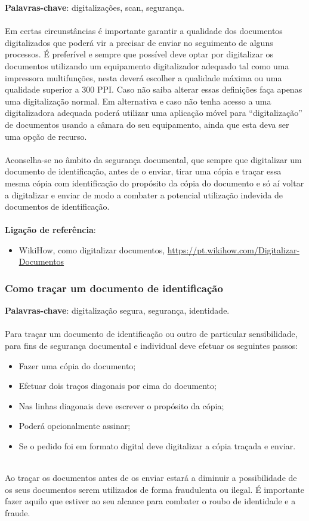\textbf{Palavras-chave}: digitalizações, scan, segurança. \\
\\
Em certas circunstâncias é importante garantir a qualidade dos
documentos digitalizados que poderá vir a precisar de enviar no
seguimento de alguns processos. É preferível e sempre que possível deve
optar por digitalizar os documentos utilizando um equipamento
digitalizador adequado tal como uma impressora multifunções, nesta
deverá escolher a qualidade máxima ou uma qualidade superior a 300 PPI.
Caso não saiba alterar essas definições faça apenas uma digitalização
normal. Em alternativa e caso não tenha acesso a uma digitalizadora
adequada poderá utilizar uma aplicação móvel para ``digitalização'' de
documentos usando a câmara do seu equipamento, ainda que esta deva ser
uma opção de recurso. \\
\\
Aconselha-se no âmbito da segurança documental, que sempre que
digitalizar um documento de identificação, antes de o enviar, tirar uma
cópia e traçar essa mesma cópia com identificação do propósito da cópia
do documento e só aí voltar a digitalizar e enviar de modo a combater a
potencial utilização indevida de documentos de identificação. \\
\\
\textbf{Ligação de referência}:
\begin{itemize}
	\item WikiHow, como digitalizar documentos, \url{https://pt.wikihow.com/Digitalizar-Documentos}
\end{itemize}

\subsubsection{Como traçar um documento de identificação}

\textbf{Palavras-chave}: digitalização segura, segurança, identidade. \\
\\
Para traçar um documento de identificação ou outro de particular
sensibilidade, para fins de segurança documental e individual deve
efetuar os seguintes passos:
\begin{itemize}
	\item Fazer uma cópia do documento;
	\item Efetuar dois traços diagonais por cima do documento;
	\item Nas linhas diagonais deve escrever o propósito da cópia;
	\item Poderá opcionalmente assinar;
	\item Se o pedido foi em formato digital deve digitalizar a cópia traçada e	enviar.
\end{itemize}
\leavevmode\\
Ao traçar os documentos antes de os enviar estará a diminuir a
possibilidade de os seus documentos serem utilizados de forma
fraudulenta ou ilegal. É importante fazer aquilo que estiver ao seu
alcance para combater o roubo de identidade e a fraude.

